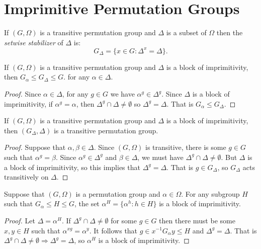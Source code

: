 \section{Imprimitive Permutation Groups}
	
\begin{definition}
If $(G,\Omega)$ is a transitive permutation group and $\Delta$
is a subset of $\Omega$ then the {\it setwise stabilizer} of $\Delta$ is:
$$G_{\Delta} = \{ x \in G : \Delta^x = \Delta \}.$$
\end{definition}

\begin{lemma}
If $(G,\Omega)$ is a transitive permutation group and $\Delta$
is a block of imprimitivity, then
$G_{\alpha} \leq G_{\Delta} \leq G$.
for any $\alpha \in \Delta$.
\begin{proof}
Since $\alpha \in \Delta$, 
for any $g \in G$ we have $\alpha^g \in \Delta^g$.
Since $\Delta$ is a block of imprimitivity,
if $\alpha^g = \alpha$, then $\Delta^g \cap \Delta \neq \emptyset$
so $\Delta^g = \Delta$. That is $G_\alpha \leq G_\Delta$.
\end{proof}
\end{lemma}

\begin{proposition}
If $(G,\Omega)$ is a transitive permutation group and $\Delta$
is a block of imprimitivity, then $(G_{\Delta},\Delta)$
is a transitive permutation group.
\begin{proof}
Suppose that $\alpha, \beta \in \Delta$.
Since $(G,\Omega)$ is transitive, there is some $g \in G$
such that $\alpha^g = \beta$. 
Since $\alpha^g \in \Delta^g$ and $\beta \in \Delta$,
we must have $\Delta^g \cap \Delta \neq \emptyset$.
But $\Delta$ is a block of imprimitivity,
so this implies that $\Delta^g = \Delta$. 
That is $g \in G_{\Delta}$,
so $G_{\Delta}$ acts transitively on $\Delta$.
\end{proof}
\end{proposition}

\begin{proposition}
Suppose that $(G,\Omega)$ is a permutation group and $\alpha \in \Omega$.
For any subgroup $H$ such that $G_\alpha \leq H \leq G$, 
the set $\alpha^H = \{\alpha^h : h \in H \}$ is a block of imprimitivity.
\begin{proof}
Let $\Delta = \alpha^H$.
If $\Delta^g \cap \Delta \neq \emptyset $ for some $g \in G$
then there must be some $ x,y \in H $ such that
$\alpha^{xg} = \alpha^y$.
It follows that $ g \in x^{-1} G_\alpha y \leq H $
and $ \Delta^g = \Delta $.
That is $ \Delta^g \cap \Delta \neq \emptyset \Rightarrow \Delta^g = \Delta$,
so $\alpha^H$ is a block of imprimitivity. 
\end{proof}
\end{proposition}


